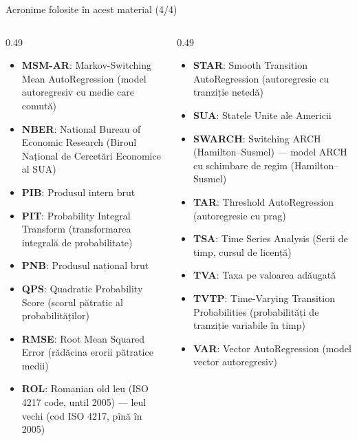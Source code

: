 \begin{frame}{Acronime folosite în acest material (4/4)}
\begin{columns}[T]
\begin{column}{0.49\textwidth}
\begin{itemize}\setlength{\itemsep}{0pt}
    \item \textbf{MSM-AR}: Markov-Switching Mean AutoRegression (model autoregresiv cu medie care comută)
    \item \textbf{NBER}: National Bureau of Economic Research (Biroul Național de Cercetări Economice al SUA)
    \item \textbf{PIB}: Produsul intern brut
    \item \textbf{PIT}: Probability Integral Transform (transformarea integrală de probabilitate)
    \item \textbf{PNB}: Produsul național brut
    \item \textbf{QPS}: Quadratic Probability Score (scorul pătratic al probabilităților)
    \item \textbf{RMSE}: Root Mean Squared Error (rădăcina erorii pătratice medii)
    \item \textbf{ROL}: Romanian old leu (ISO 4217 code, until 2005) — leul vechi (cod ISO 4217, pînă în 2005)
\end{itemize}
\end{column}
\begin{column}{0.49\textwidth}
\begin{itemize}\setlength{\itemsep}{0pt}
    \item \textbf{STAR}: Smooth Transition AutoRegression (autoregresie cu tranziție netedă)
    \item \textbf{SUA}: Statele Unite ale Americii
    \item \textbf{SWARCH}: Switching ARCH (Hamilton–Susmel) — model ARCH cu schimbare de regim (Hamilton–Susmel)
    \item \textbf{TAR}: Threshold AutoRegression (autoregresie cu prag)
    \item \textbf{TSA}: Time Series Analysis (Serii de timp, cursul de licență)
    \item \textbf{TVA}: Taxa pe valoarea adăugată
    \item \textbf{TVTP}: Time-Varying Transition Probabilities (probabilități de tranziție variabile în timp)
    \item \textbf{VAR}: Vector AutoRegression (model vector autoregresiv)
\end{itemize}
\end{column}
\end{columns}
\end{frame}


